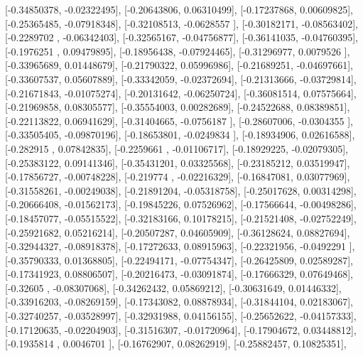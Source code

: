 \documentclass{article}
\begin{document}
       [-0.34850378, -0.02322495],
       [-0.20643806,  0.06310499],
       [-0.17237868,  0.00609825],
       [-0.25365485, -0.07918348],
       [-0.32108513, -0.0628557 ],
       [-0.30182171, -0.08563402],
       [-0.2289702 , -0.06342403],
       [-0.32565167, -0.04756877],
       [-0.36141035, -0.04760395],
       [-0.1976251 ,  0.09479895],
       [-0.18956438, -0.07924465],
       [-0.31296977,  0.0079526 ],
       [-0.33965689,  0.01448679],
       [-0.21790322,  0.05996986],
       [-0.21689251, -0.04697661],
       [-0.33607537,  0.05607889],
       [-0.33342059, -0.02372694],
       [-0.21313666, -0.03729814],
       [-0.21671843, -0.01075274],
       [-0.20131642, -0.06250724],
       [-0.36081514,  0.07575664],
       [-0.21969858,  0.08305577],
       [-0.35554003,  0.00282689],
       [-0.24522688,  0.08389851],
       [-0.22113822,  0.06941629],
       [-0.31404665, -0.0756187 ],
       [-0.28607006, -0.0304355 ],
       [-0.33505405, -0.09870196],
       [-0.18653801, -0.0249834 ],
       [-0.18934906,  0.02616588],
       [-0.282915  ,  0.07842835],
       [-0.2259661 , -0.01106717],
       [-0.18929225, -0.02079305],
       [-0.25383122,  0.09141346],
       [-0.35431201,  0.03325568],
       [-0.23185212,  0.03519947],
       [-0.17856727, -0.00748228],
       [-0.219774  , -0.02216329],
       [-0.16847081,  0.03077969],
       [-0.31558261, -0.00249038],
       [-0.21891204, -0.05318758],
       [-0.25017628,  0.00314298],
       [-0.20666408, -0.01562173],
       [-0.19845226,  0.07526962],
       [-0.17566644, -0.00498286],
       [-0.18457077, -0.05515522],
       [-0.32183166,  0.10178215],
       [-0.21521408, -0.02752249],
       [-0.25921682,  0.05216214],
       [-0.20507287,  0.04605909],
       [-0.36128624,  0.08827694],
       [-0.32944327, -0.08918378],
       [-0.17272633,  0.08915963],
       [-0.22321956, -0.0492291 ],
       [-0.35790333,  0.01368805],
       [-0.22494171, -0.07754347],
       [-0.26425809,  0.02589287],
       [-0.17341923,  0.08806507],
       [-0.20216473, -0.03091874],
       [-0.17666329,  0.07649468],
       [-0.32605   , -0.08307068],
       [-0.34262432,  0.05869212],
       [-0.30631649,  0.01446332],
       [-0.33916203, -0.08269159],
       [-0.17343082,  0.08878934],
       [-0.31844104,  0.02183067],
       [-0.32740257, -0.03528997],
       [-0.32931988,  0.04156155],
       [-0.25652622, -0.04157333],
       [-0.17120635, -0.02204903],
       [-0.31516307, -0.01720964],
       [-0.17904672,  0.03448812],
       [-0.1935814 ,  0.0046701 ],
       [-0.16762907,  0.08262919],
       [-0.25882457,  0.10825351],
\end{document}
